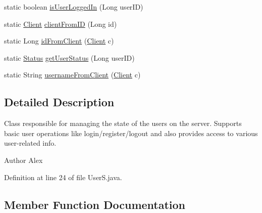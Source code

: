 \begin{DoxyCompactItemize}
\item 
static boolean \hyperlink{classpt_1_1up_1_1fe_1_1lpro1613_1_1server_1_1logic_1_1_user_s_af0725775fa11525afa9299d198d69b2a}{is\+User\+Logged\+In} (Long user\+ID)
\item 
static \hyperlink{classpt_1_1up_1_1fe_1_1lpro1613_1_1server_1_1conn_1_1_client}{Client} \hyperlink{classpt_1_1up_1_1fe_1_1lpro1613_1_1server_1_1logic_1_1_user_s_ac189b4e10d166dd53fb0e135c9565fbc}{client\+From\+ID} (Long id)
\item 
static Long \hyperlink{classpt_1_1up_1_1fe_1_1lpro1613_1_1server_1_1logic_1_1_user_s_a6ce47ad78e634c757be0ffc905799b4c}{id\+From\+Client} (\hyperlink{classpt_1_1up_1_1fe_1_1lpro1613_1_1server_1_1conn_1_1_client}{Client} c)
\item 
static \hyperlink{enumpt_1_1up_1_1fe_1_1lpro1613_1_1sharedlib_1_1structs_1_1_user_info_1_1_status}{Status} \hyperlink{classpt_1_1up_1_1fe_1_1lpro1613_1_1server_1_1logic_1_1_user_s_a92958d5006bbce1dbc15722f801d67ef}{get\+User\+Status} (Long user\+ID)
\item 
static String \hyperlink{classpt_1_1up_1_1fe_1_1lpro1613_1_1server_1_1logic_1_1_user_s_a26c28666f4e6461ee06eecfe1f55356d}{username\+From\+Client} (\hyperlink{classpt_1_1up_1_1fe_1_1lpro1613_1_1server_1_1conn_1_1_client}{Client} c)
\end{DoxyCompactItemize}


\subsection{Detailed Description}
Class responsible for managing the state of the users on the server. Supports basic user operations like login/register/logout and also provides access to various user-\/related info.

\begin{DoxyAuthor}{Author}
Alex 
\end{DoxyAuthor}


Definition at line 24 of file User\+S.\+java.



\subsection{Member Function Documentation}
\hypertarget{classpt_1_1up_1_1fe_1_1lpro1613_1_1server_1_1logic_1_1_user_s_afca9c18f164a1006c2411b8e283ec4fb}{}\label{classpt_1_1up_1_1fe_1_1lpro1613_1_1server_1_1logic_1_1_user_s_afca9c18f164a1006c2411b8e283ec4fb} 
